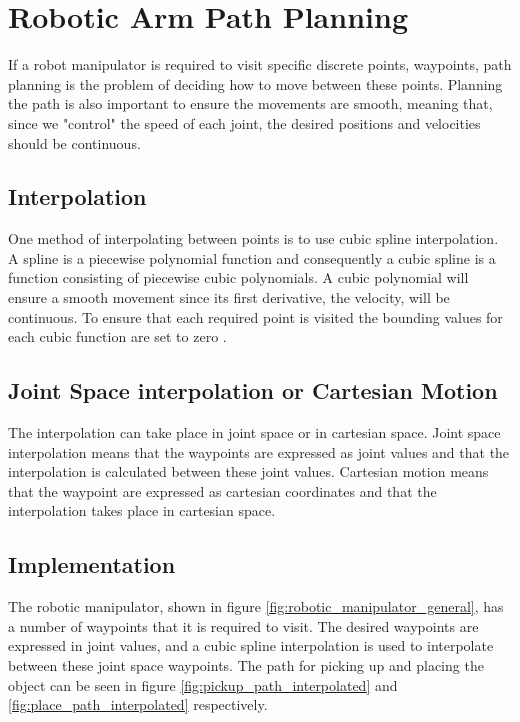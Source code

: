\section*{Robotic Arm Path Planning} 



If a robot manipulator is required to visit specific discrete points, waypoints, path planning is the problem of deciding how to move between these points. Planning the path is also important to ensure the movements are smooth, meaning that, since we "control" the speed of each joint, the desired positions and velocities should be continuous.
\subsection*{Interpolation}
One method of interpolating between points is to use cubic spline interpolation. A spline \cite{spline_wolfram} is a piecewise polynomial function and consequently a cubic spline is a function consisting of piecewise cubic polynomials. A cubic polynomial will ensure a smooth movement since its first derivative, the velocity, will be continuous. To ensure that each required point is visited the bounding values for each cubic function are set to zero \cite{cubic_spline_wolfram}.

\subsection*{Joint Space interpolation or Cartesian Motion}
The interpolation can take place in joint space or in cartesian space. Joint space interpolation means that the waypoints are expressed as joint values and that the interpolation is calculated between these joint values. Cartesian motion means that the waypoint are expressed as cartesian coordinates and that the interpolation takes place in cartesian space.

\subsection*{Implementation} %
The robotic manipulator, shown in figure \ref{fig:robotic_manipulator_general}, has a number of waypoints that it is required to visit. The desired waypoints are expressed in joint values, and a cubic spline interpolation is used to interpolate between these joint space waypoints. The path for picking up and placing the object can be seen in figure \ref{fig:pickup_path_interpolated} and \ref{fig:place_path_interpolated} respectively.

